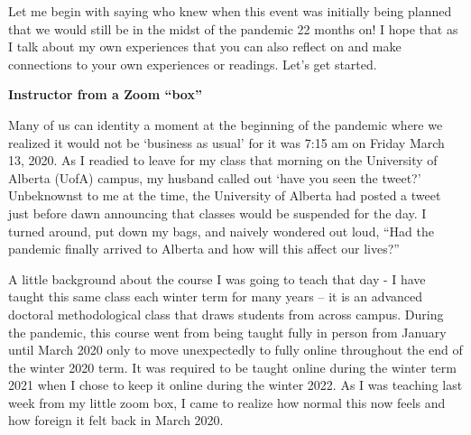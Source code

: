 \documentclass[
]{book}
\begin{document}
Let me begin with saying who knew when this event was initially being planned that we would still be in the midst of the pandemic 22 months on! I hope that as I talk about my own experiences that you can also reflect on and make connections to your own experiences or readings. Let's get started.

\textbf{Instructor from a Zoom ``box''}

Many of us can identity a moment at the beginning of the pandemic where we realized it would not be `business as usual' for it was 7:15 am on Friday March 13, 2020. As I readied to leave for my class that morning on the University of Alberta (UofA) campus, my husband called out `have you seen the tweet?' Unbeknownst to me at the time, the University of Alberta had posted a tweet just before dawn announcing that classes would be suspended for the day. I turned around, put down my bags, and naively wondered out loud, ``Had the pandemic finally arrived to Alberta and how will this affect our lives?''

A little background about the course I was going to teach that day - I have taught this same class each winter term for many years -- it is an advanced doctoral methodological class that draws students from across campus. During the pandemic, this course went from being taught fully in person from January until March 2020 only to move unexpectedly to fully online throughout the end of the winter 2020 term. It was required to be taught online during the winter term 2021 when I chose to keep it online during the winter 2022. As I was teaching last week from my little zoom box, I came to realize how normal this now feels and how foreign it felt back in March 2020.
\end{document}
